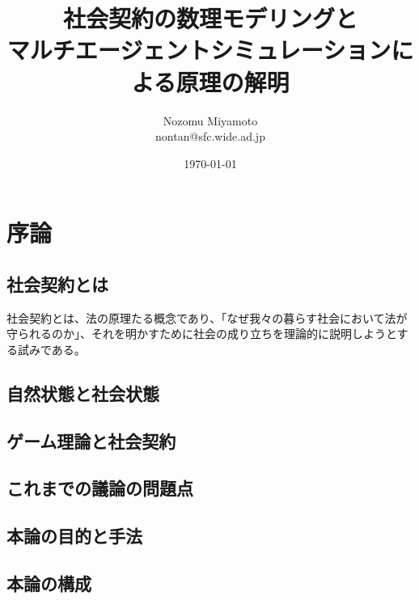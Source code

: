 \documentclass[uplatex]{jsbook}
\title{社会契約の数理モデリングと\\ マルチエージェントシミュレーションによる原理の解明}
\author{Nozomu Miyamoto \\ nontan@sfc.wide.ad.jp}
\date{\today}
\begin{document}
\maketitle



\chapter{序論}
	\section{社会契約とは}
		社会契約とは、法の原理たる概念であり、「なぜ我々の暮らす社会において法が守られるのか」、それを明かすために社会の成り立ちを理論的に説明しようとする試みである。

	\section{自然状態と社会状態}

	\section{ゲーム理論と社会契約}

	\section{これまでの議論の問題点}

	\section{本論の目的と手法}

	\section{本論の構成}
\end{document}
